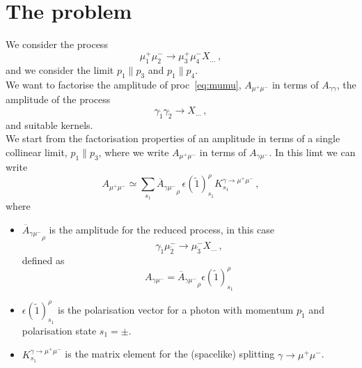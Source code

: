 \documentclass[a4paper,10pt]{article}
\begin{document}
\section{The problem}
We consider the process
\begin{equation}
    \mu^+_1 \mu^-_2 \to \mu^+_3 \mu^-_4 X_{\ldots}\,,
    \label{eq:mumu}
\end{equation}
and we consider the limit $p_1\parallel p_3$ and $p_1\parallel p_4$.\\
We want to factorise the amplitude of proc~\ref{eq:mumu}, $A_{\mu^+\mu^-}$
in terms of $A_{\gamma\gamma}$, the amplitude of the process
\begin{equation}
    \gamma_{\tilde 1} \gamma_{\tilde 2} \to X_{\ldots}\,,
    \label{eq:aa}
\end{equation}
and suitable kernels.\\
We start from the factorisation properties of an amplitude in terms of a single collinear limit, $p_1\parallel p_3$, where
we write $A_{\mu^+\mu^-}$ in terms of  $A_{\gamma \mu^-}$. In this limt we can write
\begin{equation}
    A_{\mu^+ \mu^-} \simeq \sum_{s_1} {\overline A_{\gamma \mu^-} }_\rho\,  \epsilon(\tilde 1)^\rho_{s_1} K^{\gamma\to\mu^+\mu^-}_{s_1}\,,
    \label{eq:1split}
\end{equation}
where
\begin{itemize}
        \item $  {\overline A_{\gamma \mu^-}}_\rho$ is the amplitude for the reduced process, in this case 
            \begin{equation}
                \gamma_{\tilde 1} \mu^-_{\tilde 2} \to \mu^-_{\tilde 3} X_{\ldots}\,,
            \end{equation}
             defined as 
            \begin{equation}
             A_{\gamma \mu^-}  = {\overline A_{\gamma \mu^-}}_\rho \epsilon(\tilde 1)^\rho_{s_1}
            \end{equation}
        \item $\epsilon(\tilde 1)^\rho_{s_1}$ is the polarisation vector for a photon with momentum $p_{\tilde 1}$ and polarisation
        state $s_1 =\pm$.
        \item $ K^{\gamma\to\mu^+\mu^-}_{s_1} $ is the matrix element for the (spacelike) splitting $\gamma\to \mu^+\mu^-$.
\end{itemize}
\end{document}

